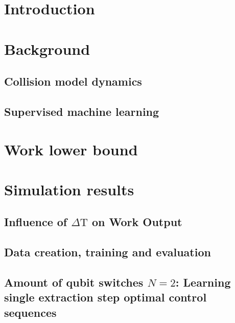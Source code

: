  
\tableofcontents



\mainmatter

\chapter{Introduction}


\chapter{Background} \label{background}
\section{Collision model dynamics} \label{col_model}


%
\section{Supervised machine learning} \label{sml}


\chapter{Work lower bound} \label{lower_bound}


\chapter{Simulation results}
\section{Influence of $\Delta \mathrm{T}$ on Work Output} \label{dep_dt}

\section{Data creation, training and evaluation} \label{data_create}

\section{Amount of qubit switches $N=2$: Learning single extraction step optimal control sequences} \label{n_2_ml}

